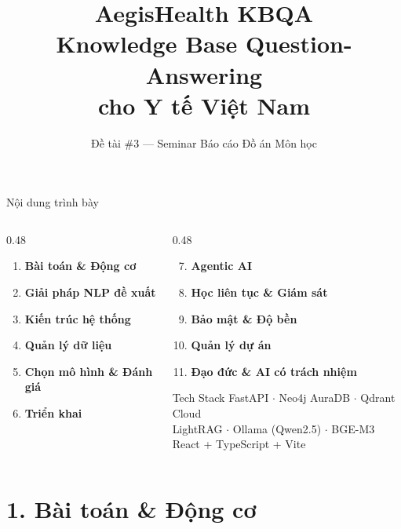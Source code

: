 \documentclass[aspectratio=169, 11pt]{beamer}
\title{\textbf{AegisHealth KBQA}\\[0.3em]
       \normalsize Knowledge Base Question-Answering\\cho Y tế Việt Nam}
\subtitle{Đề tài \#3 --- Seminar Báo cáo Đồ án Môn học}
\begin{document}

\begin{frame}[plain]
  \titlepage
\end{frame}

\begin{frame}{Nội dung trình bày}
  \begin{columns}[t]
    \begin{column}{0.48\textwidth}
      \begin{enumerate}
        \item \textbf{Bài toán \& Động cơ}
        \item \textbf{Giải pháp NLP đề xuất}
        \item \textbf{Kiến trúc hệ thống}
        \item \textbf{Quản lý dữ liệu}
        \item \textbf{Chọn mô hình \& Đánh giá}
        \item \textbf{Triển khai}
      \end{enumerate}
    \end{column}
    \begin{column}{0.48\textwidth}
      \begin{enumerate}
        \setcounter{enumi}{6}
        \item \textbf{Agentic AI}
        \item \textbf{Học liên tục \& Giám sát}
        \item \textbf{Bảo mật \& Độ bền}
        \item \textbf{Quản lý dự án}
        \item \textbf{Đạo đức \& AI có trách nhiệm}
      \end{enumerate}
      \vspace{0.4em}
      \begin{block}{Tech Stack}
        \scriptsize
        FastAPI $\cdot$ Neo4j AuraDB $\cdot$ Qdrant Cloud\\
        LightRAG $\cdot$ Ollama (Qwen2.5) $\cdot$ BGE-M3\\
        React + TypeScript + Vite
      \end{block}
    \end{column}
  \end{columns}
\end{frame}

\section{1. Bài toán \& Động cơ}
\end{document}

